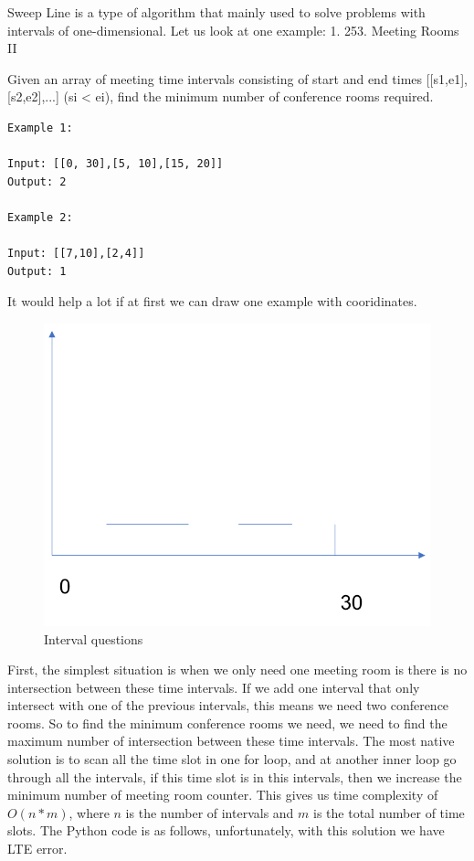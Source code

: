 \documentclass[../../main.tex]{subfiles}
\begin{document}
Sweep Line is a type of algorithm that mainly used to solve problems with intervals of one-dimensional. Let us look at one example:
1. 253. Meeting Rooms II

Given an array of meeting time intervals consisting of start and end times [[s1,e1],[s2,e2],...] (si < ei), find the minimum number of conference rooms required.
\begin{lstlisting}
Example 1:

Input: [[0, 30],[5, 10],[15, 20]]
Output: 2

Example 2:

Input: [[7,10],[2,4]]
Output: 1
\end{lstlisting}
It would help a lot if at first we can draw one example with cooridinates.
\begin{figure}[h]
    \centering
    \includegraphics[width = 0.6\columnwidth]{fig/sweep_line_253.png}
    \caption{Interval questions}
    \label{fig:interval}
\end{figure}
First, the simplest situation is when we only need one meeting room is there is no intersection between these time intervals. If we add one interval that only intersect with one of the previous intervals, this means we need two conference rooms. So to find the minimum conference rooms we need, we need to find the maximum number of intersection between these time intervals. The most native solution is to scan all the time slot in one for loop, and at another inner loop go through all the intervals, if this time slot is in this intervals, then we increase the minimum number of meeting room counter. This gives us time complexity of $O(n*m)$, where $n$ is the number of intervals and $m$ is the total number of time slots. The Python code is as follows, unfortunately, with this solution we have LTE error.  
\end{document}
